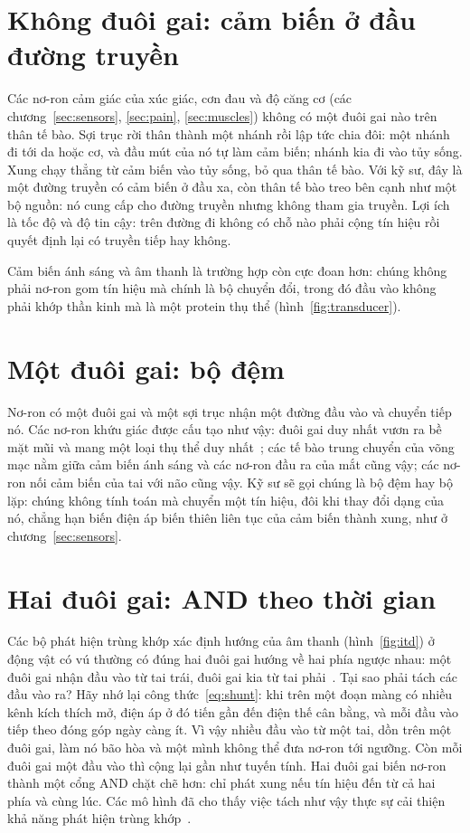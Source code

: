\section{Không đuôi gai: cảm biến ở đầu đường truyền}

Các nơ-ron cảm giác của xúc giác, cơn đau và độ căng cơ (các chương~\ref{sec:sensors}, \ref{sec:pain}, \ref{sec:muscles}) không có một đuôi gai nào trên thân tế bào. Sợi trục rời thân thành một nhánh rồi lập tức chia đôi: một nhánh đi tới da hoặc cơ, và đầu mút của nó tự làm cảm biến; nhánh kia đi vào tủy sống. Xung chạy thẳng từ cảm biến vào tủy sống, bỏ qua thân tế bào. Với kỹ sư, đây là một đường truyền có cảm biến ở đầu xa, còn thân tế bào treo bên cạnh như một bộ nguồn: nó cung cấp cho đường truyền nhưng không tham gia truyền. Lợi ích là tốc độ và độ tin cậy: trên đường đi không có chỗ nào phải cộng tín hiệu rồi quyết định lại có truyền tiếp hay không.

Cảm biến ánh sáng và âm thanh là trường hợp còn cực đoan hơn: chúng không phải nơ-ron gom tín hiệu mà chính là bộ chuyển đổi, trong đó đầu vào không phải khớp thần kinh mà là một protein thụ thể (hình~\ref{fig:transducer}).

\section{Một đuôi gai: bộ đệm}

Nơ-ron có một đuôi gai và một sợi trục nhận một đường đầu vào và chuyển tiếp nó. Các nơ-ron khứu giác được cấu tạo như vậy: đuôi gai duy nhất vươn ra bề mặt mũi và mang một loại thụ thể duy nhất~\cite{Mombaerts2004}; các tế bào trung chuyển của võng mạc nằm giữa cảm biến ánh sáng và các nơ-ron đầu ra của mắt cũng vậy; các nơ-ron nối cảm biến của tai với não cũng vậy. Kỹ sư sẽ gọi chúng là bộ đệm hay bộ lặp: chúng không tính toán mà chuyển một tín hiệu, đôi khi thay đổi dạng của nó, chẳng hạn biến điện áp biến thiên liên tục của cảm biến thành xung, như ở chương~\ref{sec:sensors}.

\section{Hai đuôi gai: AND theo thời gian}

Các bộ phát hiện trùng khớp xác định hướng của âm thanh (hình~\ref{fig:itd}) ở động vật có vú thường có đúng hai đuôi gai hướng về hai phía ngược nhau: một đuôi gai nhận đầu vào từ tai trái, đuôi gai kia từ tai phải~\cite{Grothe2010}. Tại sao phải tách các đầu vào ra? Hãy nhớ lại công thức~\eqref{eq:shunt}: khi trên một đoạn màng có nhiều kênh kích thích mở, điện áp ở đó tiến gần đến điện thế cân bằng, và mỗi đầu vào tiếp theo đóng góp ngày càng ít. Vì vậy nhiều đầu vào từ một tai, dồn trên một đuôi gai, làm nó bão hòa và một mình không thể đưa nơ-ron tới ngưỡng. Còn mỗi đuôi gai một đầu vào thì cộng lại gần như tuyến tính. Hai đuôi gai biến nơ-ron thành một cổng AND chặt chẽ hơn: chỉ phát xung nếu tín hiệu đến từ cả hai phía và cùng lúc. Các mô hình đã cho thấy việc tách như vậy thực sự cải thiện khả năng phát hiện trùng khớp~\cite{AgmonSnir1998}.

